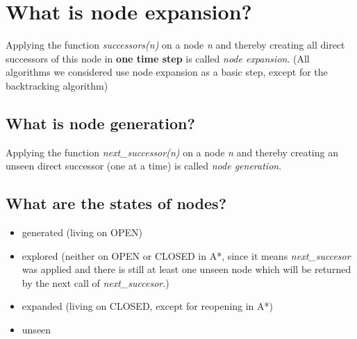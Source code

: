 \documentclass[12pt, a4paper]{article}
\begin{document}
\section{What is node expansion?}
Applying the function \textit{successors(n)} on a node \textit{n} and thereby creating all direct successors of this node in \textbf{one time step} is called \textit{node expansion}. (All algorithms we considered use node expansion as a basic step, except for the backtracking algorithm)
\subsection*{What is node generation?}
Applying the function \textit{next\_successor(n)} on a node \textit{n} and thereby creating an unseen direct successor (one at a time) is called \textit{node generation}.
\subsection*{What are the states of nodes?} \begin{itemize}
\item generated (living on OPEN)
\item explored (neither on OPEN or CLOSED in A*, since it means \textit{next\_succesor} was applied and there is still at least one unseen node which will be returned by the next call of \textit{next\_succesor}.)
\item expanded (living on CLOSED, except for reopening in A*)
\item unseen
\end{itemize}
\end{document}
